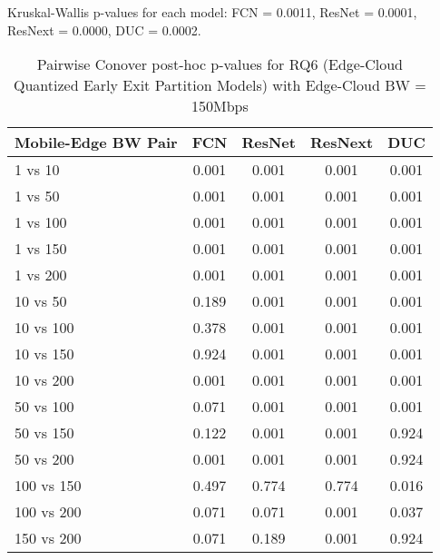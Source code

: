 \begin{table}[h]
\centering
\caption{Pairwise Conover post-hoc p-values for RQ6 (Edge-Cloud Quantized Early Exit Partition Models) with Edge-Cloud BW = 150Mbps}
\label{tab:conover_edge_cloud_quantized_earlyexit_partition_ec150}
\smallskip
Kruskal-Wallis p-values for each model: FCN = 0.0011, ResNet = 0.0001, ResNext = 0.0000, DUC = 0.0002.

\begin{tabular}{lcccc}
\toprule
Mobile-Edge BW Pair & FCN & ResNet & ResNext & DUC \\
\midrule
1 vs 10 & 0.001 & 0.001 & 0.001 & 0.001 \\
1 vs 50 & 0.001 & 0.001 & 0.001 & 0.001 \\
1 vs 100 & 0.001 & 0.001 & 0.001 & 0.001 \\
1 vs 150 & 0.001 & 0.001 & 0.001 & 0.001 \\
1 vs 200 & 0.001 & 0.001 & 0.001 & 0.001 \\
10 vs 50 & 0.189 & 0.001 & 0.001 & 0.001 \\
10 vs 100 & 0.378 & 0.001 & 0.001 & 0.001 \\
10 vs 150 & 0.924 & 0.001 & 0.001 & 0.001 \\
10 vs 200 & 0.001 & 0.001 & 0.001 & 0.001 \\
50 vs 100 & 0.071 & 0.001 & 0.001 & 0.001 \\
50 vs 150 & 0.122 & 0.001 & 0.001 & 0.924 \\
50 vs 200 & 0.001 & 0.001 & 0.001 & 0.924 \\
100 vs 150 & 0.497 & 0.774 & 0.774 & 0.016 \\
100 vs 200 & 0.071 & 0.071 & 0.001 & 0.037 \\
150 vs 200 & 0.071 & 0.189 & 0.001 & 0.924 \\
\bottomrule
\end{tabular}
\end{table}

